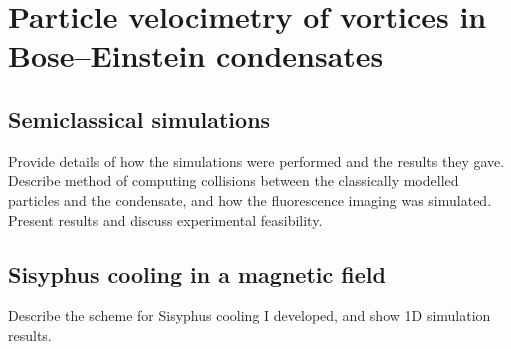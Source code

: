 
\chapter{Particle velocimetry of vortices in Bose–Einstein condensates}

    \section{Semiclassical simulations}
    Provide details of how the simulations were performed and the results they gave. Describe method of computing collisions between the classically modelled particles and the condensate, and how the fluorescence imaging was simulated. Present results and discuss experimental feasibility.

    \section{Sisyphus cooling in a magnetic field}
    Describe the scheme for Sisyphus cooling I developed, and show 1D simulation results.
